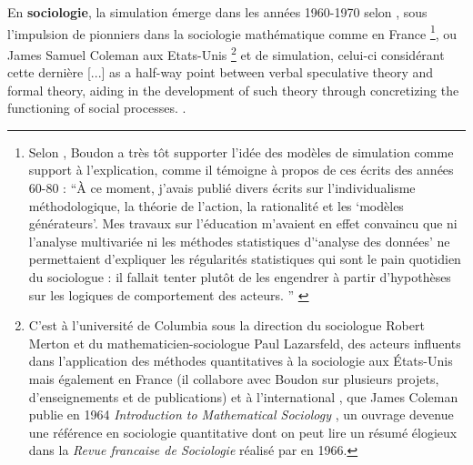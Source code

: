 
En \textbf{sociologie}, la simulation émerge dans les années 1960-1970 selon \textcite[50]{Manzo2005}, sous l'impulsion de pionniers dans la sociologie mathématique comme \textcite{Boudon1967} en France \footnote{Selon \textcite[61]{Manzo2005}, Boudon a très tôt supporter l'idée des modèles de simulation comme support à l'explication, comme il témoigne à propos de ces écrits des années 60-80 : \enquote{À ce moment, j’avais publié divers écrits sur l’individualisme méthodologique, la théorie de l’action, la rationalité et les \enquote{modèles générateurs}. Mes travaux sur l’éducation m’avaient en effet convaincu que ni l’analyse multivariée ni les méthodes statistiques d’\enquote{analyse des données}  ne permettaient d’expliquer les régularités statistiques qui sont le pain quotidien du sociologue : il fallait tenter plutôt de les engendrer à partir d’hypothèses sur les logiques de comportement des acteurs. } \autocite[391]{Boudon2003}}, ou James Samuel Coleman aux Etats-Unis \footnote{C'est à l'université de Columbia sous la direction du sociologue Robert Merton et du mathematicien-sociologue Paul Lazarsfeld, des acteurs influents dans l'application des méthodes quantitatives à la sociologie \autocite{Lazarsfeld1954} aux États-Unis mais également en France (il collabore avec Boudon sur plusieurs projets, d'enseignements et de publications) et à l'international \autocite{Lecuyer2002}, que James Coleman publie en 1964 \textit{Introduction to Mathematical Sociology} \autocite{Coleman1964}, un ouvrage devenue une référence en sociologie quantitative dont on peut lire un résumé élogieux dans la \textit{Revue francaise de Sociologie} réalisé par \textcite{Boudon1966} en 1966.} et de simulation, celui-ci considérant cette dernière {[...] as a half-way point between verbal speculative theory and formal theory, aiding in the development of such theory through concretizing the functioning of social processes. \autocite[36]{Guetzkow1972}}.

